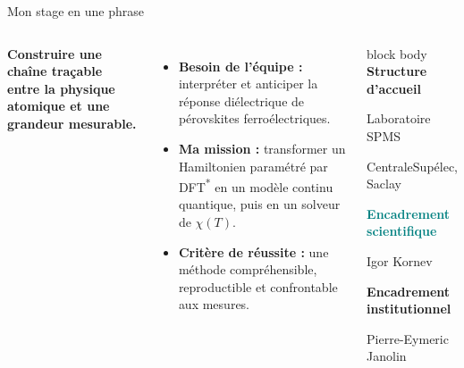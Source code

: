 \documentclass[aspectratio=169,10pt,t]{beamer}
\newcommand{\tagline}[2]{\textcolor{#1}{\bfseries #2}}
\begin{document}
\begin{frame}{Mon stage en une phrase}
  \begin{columns}[T,onlytextwidth]
      {\color{DeepNavy}\bfseries\fontsize{17}{20}\selectfont Construire une chaîne traçable entre la physique atomique et une grandeur mesurable.\par}
      \vspace{0.22cm}
      \begin{itemize}[<+->]\setlength\itemsep{0.22cm}
        \item \textbf{Besoin de l'équipe :} interpréter et anticiper la réponse diélectrique de pérovskites ferroélectriques.
        \item \textbf{Ma mission :} transformer un Hamiltonien paramétré par DFT\textsuperscript{*} en un modèle continu quantique, puis en un solveur de $\chi(T)$.
        \item \textbf{Critère de réussite :} une méthode compréhensible, reproductible et confrontable aux mesures.
      \end{itemize}
      \begin{beamercolorbox}[rounded=true,sep=0.75em]{block body}
        \tagline{CSOrange}{Structure d'accueil}\par
        Laboratoire SPMS\par
        CentraleSupélec, Saclay

        \vspace{0.24cm}
        \tagline{Teal}{Encadrement scientifique}\par
        Igor Kornev

        \vspace{0.24cm}
        \tagline{WarmGold}{Encadrement institutionnel}\par
        Pierre-Eymeric Janolin
      \end{beamercolorbox}
  \end{columns}
\end{frame}
\end{document}
